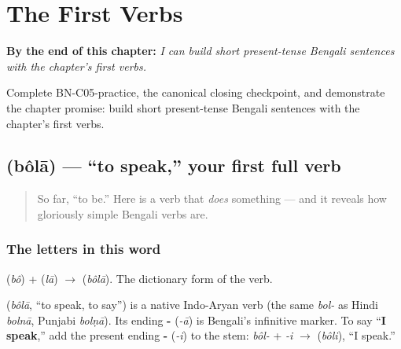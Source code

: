 
\chapter{The First Verbs}
\label{ch:first-verbs}

\begin{chapteropening}
\textbf{By the end of this chapter:} \emph{I can build short present-tense Bengali sentences with the chapter's first verbs.}

Complete BN-C05-practice, the canonical closing checkpoint, and demonstrate the chapter promise: build short present-tense Bengali sentences with the chapter's first verbs.
\end{chapteropening}

\section[\texorpdfstring{\bn{বলা} (bôlā)}{বলা (bôlā)}]{ (bôlā) — \textquotedblleft{}to speak,\textquotedblright{} your first full verb}

\label{lesson:BN-C05-bola}



\begin{quote}
So far, \textquotedblleft{}to be.\textquotedblright{} Here is a verb that \emph{does} something — and it reveals how gloriously simple Bengali verbs are.
\end{quote}

\subsection*{The letters in this word}
\textbf{} (\emph{bô}) + \textbf{} (\emph{lā}) $\to$ \textbf{} (\emph{bôlā}). The dictionary form of the verb.

\begin{cousinweb}
\textbf{} (\emph{bôlā}, \textquotedblleft{}to speak, to say\textquotedblright{}) is a native Indo-Aryan verb (the same \emph{bol-} as Hindi \emph{bolnā}, Punjabi \emph{bolṇā}). Its ending \textbf{-} (\emph{-ā}) is Bengali's infinitive marker. To say \textquotedblleft{}\textbf{I speak},\textquotedblright{} add the present ending \textbf{-} (\emph{-i}) to the stem: \emph{bôl-} + \emph{-i} $\to$ \textbf{} (\emph{bôli}), \textquotedblleft{}I speak.\textquotedblright{}
\end{cousinweb}

